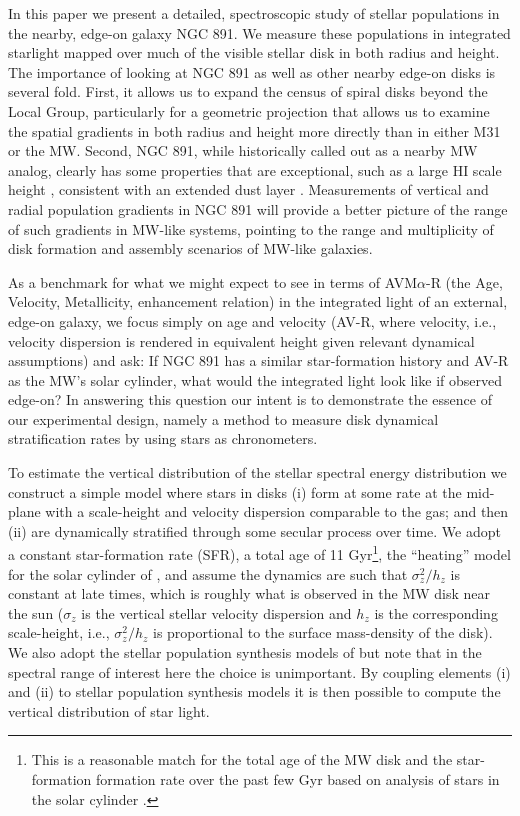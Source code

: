 In this paper we present a detailed, spectroscopic study of stellar
populations in the nearby, edge-on galaxy NGC 891. We measure these
populations in integrated starlight mapped over much of the visible
stellar disk in both radius and height. The importance of looking at
NGC 891 as well as other nearby edge-on disks is several fold. First,
it allows us to expand the census of spiral disks beyond the Local
Group, particularly for a geometric projection that allows us to
examine the spatial gradients in both radius and height more directly
than in either M31 or the MW.  Second, NGC 891, while historically
called out as a nearby MW analog, clearly has some properties that are
exceptional, such as a large HI scale height \citep[$\sim$1
kpc][]{Oosterloo07}, consistent with an extended dust layer
\citep{Howk00}. Measurements of vertical and radial population
gradients in NGC 891 will provide a better picture of the range of
such gradients in MW-like systems, pointing to the range and
multiplicity of disk formation and assembly scenarios of MW-like
galaxies.

As a benchmark for what we might expect to see in terms of
AVM$\alpha$-R (the Age, Velocity, Metallicity, enhancement relation)
in the integrated light of an external, edge-on galaxy, we focus
simply on age and velocity (AV-R, where velocity, i.e., velocity
dispersion is rendered in equivalent height given relevant dynamical
assumptions) and ask: If NGC 891 has a similar star-formation history
and AV-R as the MW's solar cylinder, what would the integrated light
look like if observed edge-on? In answering this question our intent
is to demonstrate the essence of our experimental design, namely a
method to measure disk dynamical stratification rates by using stars
as chronometers.

To estimate the vertical distribution of the stellar spectral energy
distribution we construct a simple model where stars in disks (i) form
at some rate at the mid-plane with a scale-height and velocity
dispersion comparable to the gas; and then (ii) are dynamically
stratified through some secular process over time. We adopt a constant
star-formation rate (SFR), a total age of 11 Gyr\footnote{This is a
  reasonable match for the total age of the MW disk and the
  star-formation formation rate over the past few Gyr based on
  analysis of stars in the solar cylinder
  \citep[e.g.,][]{Pilyugin96a}.}, the ``heating'' model for the solar
cylinder of \citet{Aumer09}, and assume the dynamics are such that
$\sigma_z^2/h_z$ is constant at late times, which is roughly what is
observed in the MW disk near the sun ($\sigma_z$ is the vertical
stellar velocity dispersion and $h_z$ is the corresponding
scale-height, i.e., $\sigma_z^2/h_z$ is proportional to the surface
mass-density of the disk). We also adopt the stellar population
synthesis models of \citet{Bruzual03} but note that in the spectral
range of interest here the choice is unimportant. By coupling elements
(i) and (ii) to stellar population synthesis models it is then
possible to compute the vertical distribution of star light.

